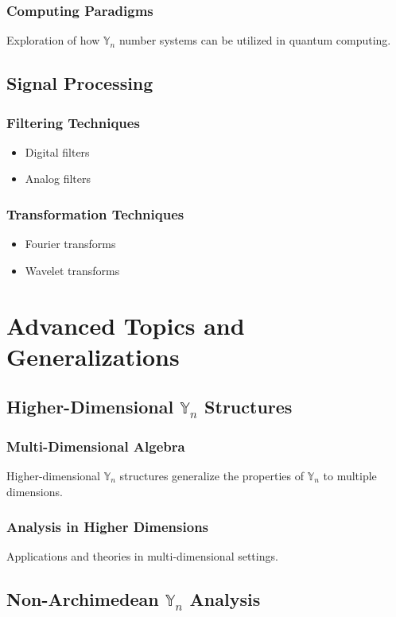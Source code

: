 \documentclass[12pt]{book}
\begin{document}
\subsection{Computing Paradigms}
Exploration of how $\mathbb{Y}_n$ number systems can be utilized in quantum computing.

\section{Signal Processing}
\subsection{Filtering Techniques}
\begin{itemize}
    \item Digital filters
    \item Analog filters
\end{itemize}
\subsection{Transformation Techniques}
\begin{itemize}
    \item Fourier transforms
    \item Wavelet transforms
\end{itemize}

\chapter{Advanced Topics and Generalizations}
\section{Higher-Dimensional $\mathbb{Y}_n$ Structures}
\subsection{Multi-Dimensional Algebra}
\begin{definition}
Higher-dimensional $\mathbb{Y}_n$ structures generalize the properties of $\mathbb{Y}_n$ to multiple dimensions.
\end{definition}
\subsection{Analysis in Higher Dimensions}
Applications and theories in multi-dimensional settings.

\section{Non-Archimedean $\mathbb{Y}_n$ Analysis}
\end{document}
